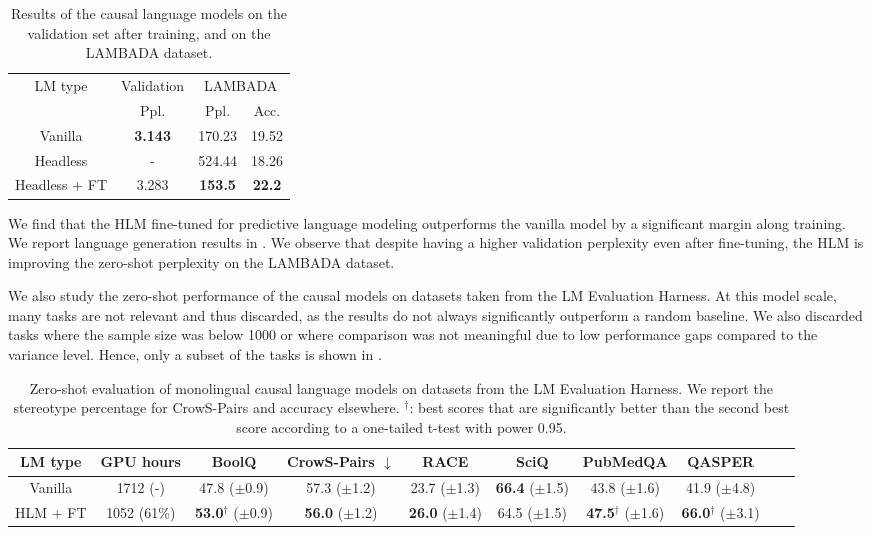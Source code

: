\begin{table}
\centering
\small
\begin{tabular}{c|ccc}
\toprule
\multirow{2}{*}{LM type} & Validation & \multicolumn{2}{c}{LAMBADA} \\
        \cmidrule{2-2} \cmidrule{3-4}
        {} & Ppl. & Ppl. & Acc. \\ \midrule
Vanilla  &     \textbf{3.143}  &  170.23 & 19.52 \\ 
Headless  &     -  &  524.44 & 18.26 \\ 
Headless + FT & 3.283 & \textbf{153.5} & \textbf{22.2}\\ \bottomrule
\end{tabular}
\caption{Results of the causal language models on the validation set after training, and on the LAMBADA dataset.}
\label{tab:lm_results}
\end{table}

We find that the HLM fine-tuned for predictive language modeling outperforms the vanilla model by a significant margin along training. We report language generation results in . We observe that despite having a higher validation perplexity even after fine-tuning, the HLM is improving the zero-shot perplexity on the LAMBADA dataset.

We also study the zero-shot performance of the causal models on datasets taken from the LM Evaluation Harness. At this model scale, many tasks are not relevant and thus discarded, as the results do not always significantly outperform a random baseline. We also discarded tasks where the sample size was below 1000 or where comparison was not meaningful due to low performance gaps compared to the variance level. %
Hence, only a subset of the tasks is shown in
.


\begin{table}
\centering \small
\begin{tabular}{cc|cccccccc}
\toprule
LM type       &GPU hours      & BoolQ          & CrowS-Pairs $\downarrow$   & RACE           & SciQ          & PubMedQA &  QASPER    \\ \midrule
Vanilla       &1712 \tiny{(-)} & 47.8 \tiny{($\pm$0.9)}          & 57.3 \tiny{($\pm$1.2)}         & 23.7 \tiny{($\pm$1.3)}           & \textbf{66.4} \tiny{($\pm$1.5)}  & 43.8 \tiny{($\pm$1.6)} &  41.9 \tiny{($\pm$4.8)}        \\ 
HLM \tiny{+ FT} & 1052 \tiny{(61\%)}         & \textbf{53.0}$^\dagger$ \tiny{($\pm$0.9)}           & \textbf{56.0} \tiny{($\pm$1.2)}         & \textbf{26.0} \tiny{($\pm$1.4)}  & 64.5 \tiny{($\pm$1.5)}          & \textbf{47.5}$^\dagger$ \tiny{($\pm$1.6)}  & \textbf{66.0}$^\dagger$ \tiny{($\pm$3.1)}      \\ \bottomrule
\end{tabular}
\caption{Zero-shot evaluation of monolingual causal language models on datasets from the LM Evaluation Harness. We report the stereotype percentage for CrowS-Pairs and accuracy elsewhere. $^\dagger$: best scores that are significantly better than the second best score according to a one-tailed t-test with power 0.95.}
\label{tab:lm_zs_perf}
\end{table}

